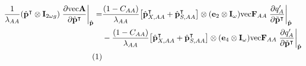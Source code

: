 \documentclass[11pt]{article}
\newcommand\numberthis{\addtocounter{equation}{1}\tag{\theequation}}
\def\mbf#1{\mathbf{#1}}
\begin{document}
\begin{align*}
	\frac{1}{\lambda_{AA}}(\hat{\mbf{p}}^{\intercal} \otimes \mbf{I}_{2 \omega g}) \left. \frac{ \partial \text{vec}\mbf{A}}{\partial \hat{\mbf{p}}^{\intercal}} \right|_{\hat{\mbf{p}}} = 
		&\frac{(1 - C_{AA})}{\lambda_{AA}} \big[ \hat{\mbf{p}}^{\intercal}_{X,AA}+ \hat{\mbf{p}}^{\intercal}_{S,AA} \big]\otimes (\mbf{e}_{2} \otimes \mbf{I}_{\omega}) \text{vec}\mbf{F}_{AA} \left.\frac{\partial q^{\prime}_{A}}{\partial \tilde{\mbf{p}}^{\intercal}} \right|_{\hat{\mbf{p}}} \\
		&-\frac{(1 - C_{AA})}{\lambda_{AA}} \big[ \hat{\mbf{p}}^{\intercal}_{X,AA}+ \hat{\mbf{p}}^{\intercal}_{S,AA} \big]\otimes (\mbf{e}_{4} \otimes \mbf{I}_{\omega}) \text{vec}\mbf{F}_{AA} \left.\frac{\partial q^{\prime}_{A}}{\partial \tilde{\mbf{p}}^{\intercal}} \right|_{\hat{\mbf{p}}} \\
	   \numberthis
\end{align*}
\end{document}
